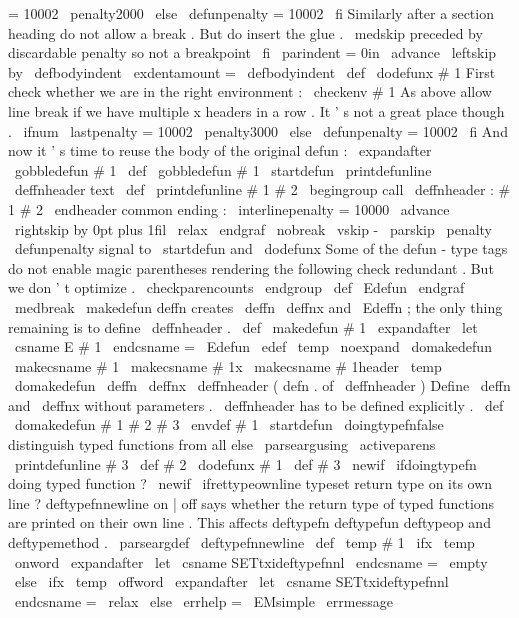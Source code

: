 {{{{=
10002
\
penalty2000
\
else
\
defunpenalty
=
10002
\
fi
%
%
Similarly
after
a
section
heading
do
not
allow
a
break
.
%
But
do
insert
the
glue
.
\
medskip
%
preceded
by
discardable
penalty
so
not
a
breakpoint
\
fi
%
\
parindent
=
0in
\
advance
\
leftskip
by
\
defbodyindent
\
exdentamount
=
\
defbodyindent
}
\
def
\
dodefunx
#
1
{
%
%
First
check
whether
we
are
in
the
right
environment
:
\
checkenv
#
1
%
%
%
As
above
allow
line
break
if
we
have
multiple
x
headers
in
a
row
.
%
It
'
s
not
a
great
place
though
.
\
ifnum
\
lastpenalty
=
10002
\
penalty3000
\
else
\
defunpenalty
=
10002
\
fi
%
%
And
now
it
'
s
time
to
reuse
the
body
of
the
original
defun
:
\
expandafter
\
gobbledefun
#
1
%
}
\
def
\
gobbledefun
#
1
\
startdefun
{
}
%
\
printdefunline
\
deffnheader
{
text
}
%
\
def
\
printdefunline
#
1
#
2
{
%
\
begingroup
%
call
\
deffnheader
:
#
1
#
2
\
endheader
%
common
ending
:
\
interlinepenalty
=
10000
\
advance
\
rightskip
by
0pt
plus
1fil
\
relax
\
endgraf
\
nobreak
\
vskip
-
\
parskip
\
penalty
\
defunpenalty
%
signal
to
\
startdefun
and
\
dodefunx
%
Some
of
the
defun
-
type
tags
do
not
enable
magic
parentheses
%
rendering
the
following
check
redundant
.
But
we
don
'
t
optimize
.
\
checkparencounts
\
endgroup
}
\
def
\
Edefun
{
\
endgraf
\
medbreak
}
%
\
makedefun
{
deffn
}
creates
\
deffn
\
deffnx
and
\
Edeffn
;
%
the
only
thing
remaining
is
to
define
\
deffnheader
.
%
\
def
\
makedefun
#
1
{
%
\
expandafter
\
let
\
csname
E
#
1
\
endcsname
=
\
Edefun
\
edef
\
temp
{
\
noexpand
\
domakedefun
\
makecsname
{
#
1
}
\
makecsname
{
#
1x
}
\
makecsname
{
#
1header
}
}
%
\
temp
}
%
\
domakedefun
\
deffn
\
deffnx
\
deffnheader
{
(
defn
.
of
\
deffnheader
)
}
%
%
Define
\
deffn
and
\
deffnx
without
parameters
.
%
\
deffnheader
has
to
be
defined
explicitly
.
%
\
def
\
domakedefun
#
1
#
2
#
3
{
%
\
envdef
#
1
{
%
\
startdefun
\
doingtypefnfalse
%
distinguish
typed
functions
from
all
else
\
parseargusing
\
activeparens
{
\
printdefunline
#
3
}
%
}
%
\
def
#
2
{
\
dodefunx
#
1
}
%
\
def
#
3
%
}
\
newif
\
ifdoingtypefn
%
doing
typed
function
?
\
newif
\
ifrettypeownline
%
typeset
return
type
on
its
own
line
?
%
deftypefnnewline
on
|
off
says
whether
the
return
type
of
typed
functions
%
are
printed
on
their
own
line
.
This
affects
deftypefn
deftypefun
%
deftypeop
and
deftypemethod
.
%
\
parseargdef
\
deftypefnnewline
{
%
\
def
\
temp
{
#
1
}
%
\
ifx
\
temp
\
onword
\
expandafter
\
let
\
csname
SETtxideftypefnnl
\
endcsname
=
\
empty
\
else
\
ifx
\
temp
\
offword
\
expandafter
\
let
\
csname
SETtxideftypefnnl
\
endcsname
=
\
relax
\
else
\
errhelp
=
\
EMsimple
\
errmessage
}}}}
